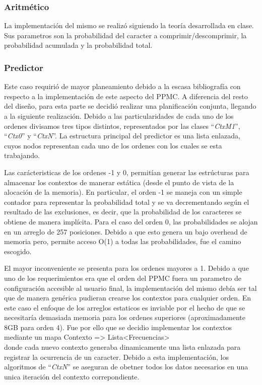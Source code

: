 \documentclass{article}
\begin{document}
\subsubsection{Aritmético}
\medskip

	La implementación del mismo se realizó siguiendo la teoría desarrollada en clase. Sus parametros son la probabilidad del caracter a comprimir/descomprimir, la probabilidad acumulada y la probabilidad total. 

\bigskip



\subsubsection{Predictor}
\medskip

	Este caso requirió de mayor planeamiento debido a la escasa bibliografía con respecto a la implementación de este aspecto del PPMC. A diferencia del resto del diseño, para esta parte se decidió realizar una planificación conjunta, llegando a la siguiente realización. Debido a las particularidades de cada uno de los ordenes divisamos tres tipos distintos, representados por las clases ``\textit{CtxM1}'', ``\textit{Ctx0}'' y ``\textit{CtxN}''. La estructura principal del predictor es una lista enlazada, cuyos nodos representan cada uno de los ordenes con los cuales se esta trabajando.
	\par
	Las carácteristicas de los ordenes -1 y 0, permitían generar las estrúcturas para almacenar los contextos de manerar estática (desde el punto de vista de la alocación de la memoria). En particular, el orden -1 se maneja con un simple contador para representar la probabilidad total y se va decrementando según el resultado de las exclusiones, es decir, que la probabilidad de los caracteres se obtiene de manera implícita. Para el caso del orden 0, las probabilidades se alojan en un arreglo de 257 posiciones. Debido a que esto genera un bajo overhead de memoria pero, permite acceso O(1) a todas las probabilidades, fue el camino escogido.
	\par
	El mayor inconveniente se presenta para los ordenes mayores a 1. Debido a que uno de los requerimientos era que el orden del PPMC fuera un parametro de configuración accesible al usuario final, la implementación del mismo debía ser tal que de manera genérica pudieran crearse los contextos para cualquier orden. En este caso el enfoque de los arreglos estaticos es inviable por el hecho de que se necesitaría demasiada memoria para los ordenes superiores (aproximadamente 8GB para orden 4).
	Fue por ello que se decidio implementar los contextos mediante un mapa {\ttfamily\footnotesize Contexto => Lista<Frecuencias> \\} donde cada nuevo contexto generaba dinamicamente una lista enlazada para registrar la ocurrencia de un caracter. Debido a esta implementación, los algoritmos de ``\textit{CtxN}'' se aseguran de obetner todos los datos necesarios en una unica iteración del contexto correpondiente.
	\par
\end{document}
